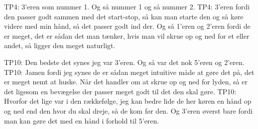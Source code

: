 TP4: 3’eren som nummer 1. Og så nummer 1 og så nummer 2.
TP4: 3’eren fordi den passer godt sammen med det start-stop, så kan man starte den og så køre videre med min hånd, så det passer godt ind der. Og så 1’eren og 2’eren fordi de er meget, det er sådan det man tænker, hvis man vil skrue op og ned for et eller andet, så ligger den meget naturligt. 

TP10: Den bedste det synes jeg var 3’eren. Og så var det nok 5’eren og 2’eren.
TP10: Jamen fordi jeg synes de er sådan meget intuitive måde at gøre det på, det er meget nemt at huske. Når det handler om at skrue op og ned for lyden, så er det ligesom en bevægelse der passer meget godt til det den skal gøre. 
TP10: Hvorfor det lige var i den rækkefølge, jeg kan bedre lide de her køren en hånd op og ned end den hvor du skal dreje, så de kom før den. Og 3’eren øverst bare fordi man kan gøre det med en hånd i forhold til 5’eren.











 

























